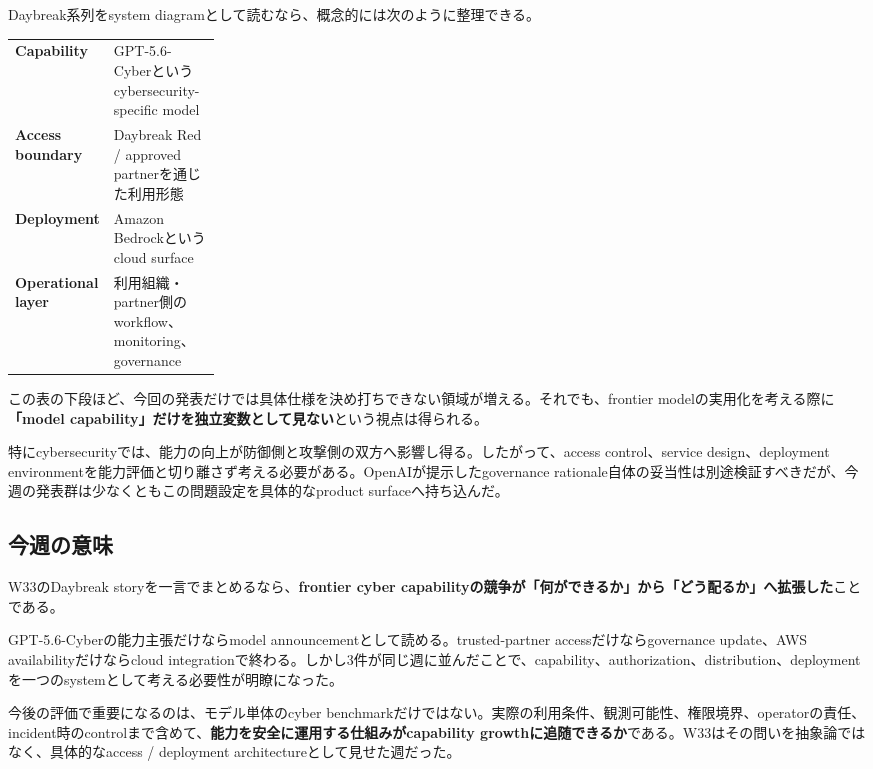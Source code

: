Daybreak系列をsystem diagramとして読むなら、概念的には次のように整理できる。

\begin{center}
\small
\begin{tabularx}{0.96\linewidth}{@{}>{\bfseries}p{0.24\linewidth}X@{}}
Capability & GPT-5.6-Cyberというcybersecurity-specific model \\
Access boundary & Daybreak Red / approved partnerを通じた利用形態 \\
Deployment & Amazon Bedrockというcloud surface \\
Operational layer & 利用組織・partner側のworkflow、monitoring、governance \\
\end{tabularx}
\end{center}

この表の下段ほど、今回の発表だけでは具体仕様を決め打ちできない領域が増える。それでも、frontier modelの実用化を考える際に\textbf{「model capability」だけを独立変数として見ない}という視点は得られる。

特にcybersecurityでは、能力の向上が防御側と攻撃側の双方へ影響し得る。したがって、access control、service design、deployment environmentを能力評価と切り離さず考える必要がある。OpenAIが提示したgovernance rationale自体の妥当性は別途検証すべきだが、今週の発表群は少なくともこの問題設定を具体的なproduct surfaceへ持ち込んだ。

\subsection*{今週の意味}

W33のDaybreak storyを一言でまとめるなら、\textbf{frontier cyber capabilityの競争が「何ができるか」から「どう配るか」へ拡張した}ことである。

GPT-5.6-Cyberの能力主張だけならmodel announcementとして読める。trusted-partner accessだけならgovernance update、AWS availabilityだけならcloud integrationで終わる。しかし3件が同じ週に並んだことで、capability、authorization、distribution、deploymentを一つのsystemとして考える必要性が明瞭になった。

今後の評価で重要になるのは、モデル単体のcyber benchmarkだけではない。実際の利用条件、観測可能性、権限境界、operatorの責任、incident時のcontrolまで含めて、\textbf{能力を安全に運用する仕組みがcapability growthに追随できるか}である。W33はその問いを抽象論ではなく、具体的なaccess / deployment architectureとして見せた週だった。
